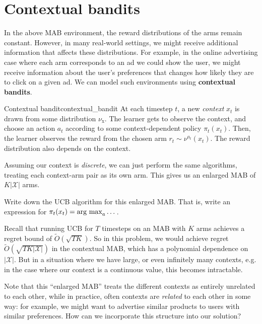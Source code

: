 \documentclass[\main/main]{subfiles}
\begin{document}
\iffalse
    \section{Gittins index}

\fi

\section{Contextual bandits}

In the above MAB environment, the reward distributions of the arms remain constant.
However, in many real-world settings, we might receive additional information that affects these distributions.
For example, in the online advertising case where each arm corresponds to an ad we could show the user,
we might receive information about the user's preferences that changes how likely they are to click on a given ad.
We can model such environments using \textbf{contextual bandits}.

\begin{definition}{Contextual bandit}{contextual_bandit}
    At each timestep $t$, a new \emph{context} $x_t$ is drawn from some distribution $\nu_{\text{x}}$.
    The learner gets to observe the context, and choose an action $a_t$ according to some context-dependent policy $\pi_t(x_t)$.
    Then, the learner observes the reward from the chosen arm $r_t \sim \nu^{a_t}(x_t)$. The reward distribution also depends on the context.
\end{definition}

Assuming our context is \emph{discrete}, we can just perform the same algorithms, treating each context-arm pair as its own arm. This gives us an enlarged MAB of $K |\mathcal{X}|$ arms.

\begin{exercise}
    Write down the UCB algorithm for this enlarged MAB. That is, write an expression for $\pi_t(x_t) = \operatorname*{\textrm{arg\ max}}_a \dots$.
\end{exercise}

Recall that running UCB for $T$ timesteps on an MAB with $K$ arms achieves a regret bound of $\tilde{O}(\sqrt{TK})$. So in this problem, we would achieve regret $\tilde{O}(\sqrt{TK|\mathcal{X}|})$ in the contextual MAB, which has a polynomial dependence on $|\mathcal{X}|$.
But in a situation where we have large, or even infinitely many contexts, e.g. in the case where our context is a continuous value, this becomes intractable.

Note that this ``enlarged MAB'' treats the different contexts as entirely unrelated to each other, while in practice, often contexts are \emph{related} to each other in some way: for example, we might want to advertise similar products to users with similar preferences.
How can we incorporate this structure into our solution?
\end{document}
